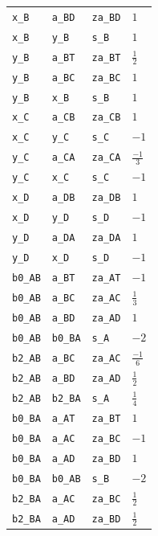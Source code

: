 \begin{longtable}{llll}
\texttt{x\_B} & \texttt{a\_BD} & \texttt{za\_BD} & $1$\\
\texttt{x\_B} & \texttt{y\_B} & \texttt{s\_B} & $1$\\
\texttt{y\_B} & \texttt{a\_BT} & \texttt{za\_BT} & $\frac{1}{2}$\\
\texttt{y\_B} & \texttt{a\_BC} & \texttt{za\_BC} & $1$\\
\texttt{y\_B} & \texttt{x\_B} & \texttt{s\_B} & $1$\\
\texttt{x\_C} & \texttt{a\_CB} & \texttt{za\_CB} & $1$\\
\texttt{x\_C} & \texttt{y\_C} & \texttt{s\_C} & $-1$\\
\texttt{y\_C} & \texttt{a\_CA} & \texttt{za\_CA} & $\frac{-1}{3}$\\
\texttt{y\_C} & \texttt{x\_C} & \texttt{s\_C} & $-1$\\
\texttt{x\_D} & \texttt{a\_DB} & \texttt{za\_DB} & $1$\\
\texttt{x\_D} & \texttt{y\_D} & \texttt{s\_D} & $-1$\\
\texttt{y\_D} & \texttt{a\_DA} & \texttt{za\_DA} & $1$\\
\texttt{y\_D} & \texttt{x\_D} & \texttt{s\_D} & $-1$\\
\texttt{b0\_AB} & \texttt{a\_BT} & \texttt{za\_AT} & $-1$\\
\texttt{b0\_AB} & \texttt{a\_BC} & \texttt{za\_AC} & $\frac{1}{3}$\\
\texttt{b0\_AB} & \texttt{a\_BD} & \texttt{za\_AD} & $1$\\
\texttt{b0\_AB} & \texttt{b0\_BA} & \texttt{s\_A} & $-2$\\
\texttt{b2\_AB} & \texttt{a\_BC} & \texttt{za\_AC} & $\frac{-1}{6}$\\
\texttt{b2\_AB} & \texttt{a\_BD} & \texttt{za\_AD} & $\frac{1}{2}$\\
\texttt{b2\_AB} & \texttt{b2\_BA} & \texttt{s\_A} & $\frac{1}{4}$\\
\texttt{b0\_BA} & \texttt{a\_AT} & \texttt{za\_BT} & $1$\\
\texttt{b0\_BA} & \texttt{a\_AC} & \texttt{za\_BC} & $-1$\\
\texttt{b0\_BA} & \texttt{a\_AD} & \texttt{za\_BD} & $1$\\
\texttt{b0\_BA} & \texttt{b0\_AB} & \texttt{s\_B} & $-2$\\
\texttt{b2\_BA} & \texttt{a\_AC} & \texttt{za\_BC} & $\frac{1}{2}$\\
\texttt{b2\_BA} & \texttt{a\_AD} & \texttt{za\_BD} & $\frac{1}{2}$\\

\end{longtable}
